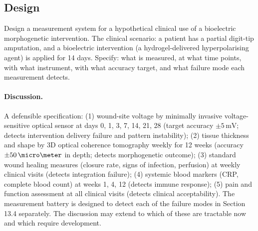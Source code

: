 \subsection*{Design}

\begin{exercise}
Design a measurement system for a hypothetical clinical use of a
bioelectric morphogenetic intervention. The clinical scenario: a
patient has a partial digit-tip amputation, and a bioelectric
intervention (a hydrogel-delivered hyperpolarising agent) is applied
for 14 days. Specify: what is measured, at what time points, with
what instrument, with what accuracy target, and what failure mode
each measurement detects.

\paragraph{Discussion.}
A defensible specification: (1) wound-site voltage by minimally
invasive voltage-sensitive optical sensor at days 0, 1, 3, 7, 14,
21, 28 (target accuracy $\pm 5\,\text{mV}$; detects intervention
delivery failure and pattern instability); (2) tissue thickness and
shape by 3D optical coherence tomography weekly for 12 weeks
(accuracy $\pm 50\,\micro\meter$ in depth; detects morphogenetic
outcome); (3) standard wound healing measures (closure rate, signs
of infection, perfusion) at weekly clinical visits (detects
integration failure); (4) systemic blood markers (CRP, complete blood
count) at weeks 1, 4, 12 (detects immune response); (5) pain and
function assessment at all clinical visits (detects clinical
acceptability). The measurement battery is designed to detect each of
the failure modes in Section 13.4 separately. The discussion may
extend to which of these are tractable now and which require
development.
\end{exercise}

